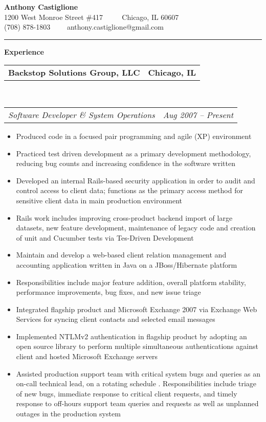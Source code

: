 \documentclass[10pt,letterpaper]{article}
\makeatletter
\newcommand{\headerrow}[2]
{\begin{tabular*}{\linewidth}{l@{\extracolsep{\fill}}r}
	#1 &
	#2 \\
\end{tabular*}}
\newenvironment{indentsection}[1]%
{\begin{list}{}%
	{\setlength{\leftmargin}{#1}}%
	\item[]%
}
{\end{list}}
\makeatother
\begin{document}
\begin{center}
{\LARGE \textbf {Anthony Castiglione}} \\  1200 West Monroe Street \#417 \ \ \textbullet
       \ \ Chicago, IL 60607 \\ (708) 878-1803 \ \ \textbullet \ \ anthony.castiglione@gmail.com
	\end{center}
\hrule
\vspace{0.2in}
{\large \textbf{Experience}}


\begin{indentsection}{\parindent}
	\headerrow
		{\textbf{Backstop Solutions Group, LLC} }
		{\textbf{Chicago, IL}}
	\\
	\headerrow
		{\emph{Software Developer \& System Operations}}
		{\emph{Aug 2007 -- Present}}

	\begin{itemize}
	\renewcommand{\labelitemi}{$-$}
	\vspace{-0.1in}
    \item Produced code in a focused pair programming and agile (XP)
environment
    \item Practiced test driven development as a primary development
methodology, reducing bug counts and increasing confidence in the software
written
		\item Developed an internal Rails-based security application in order to audit and control access to client data; functions as the primary access method for sensitive client data in main production environment
    \item Rails work includes improving cross-product backend import of large
datasets, new feature development, maintenance of legacy code and creation of
unit and Cucumber tests via Tes-Driven Development
		\item Maintain and develop a web-based client relation management and accounting application written in Java on a JBoss/Hibernate platform
		\item Responsibilities include major feature addition, overall platform stability, performance improvements, bug fixes, and new issue triage
		\item Integrated flagship product and Microsoft Exchange 2007 via Exchange Web Services for syncing client contacts and selected email messages
		\item Implemented NTLMv2 authentication in flagship product by adopting an open source library to perform multiple simultaneous authentications against client and hosted Microsoft Exchange servers
		\item Assisted production support team with critical system bugs and queries as an on-call technical lead, on a rotating schedule . Responsibilities include triage of new bugs, immediate response to critical client requests, and timely response to off-hours support team queries and requests as well as unplanned outages in the production system
	\end{itemize}
\end{indentsection}
\end{document}
